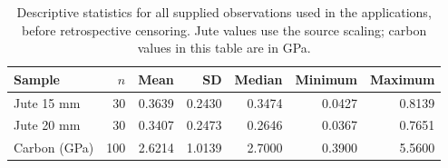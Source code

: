 \begin{table}[htbp]
\centering
\caption{Descriptive statistics for all supplied observations used in the applications, before retrospective censoring. Jute values use the source scaling; carbon values in this table are in GPa.}\label{tab:descriptive}
\small
\begin{tabular}{lrrrrrr}
\toprule
Sample & $n$ & Mean & SD & Median & Minimum & Maximum \\
\midrule
Jute 15 mm & 30 & 0.3639 & 0.2430 & 0.3474 & 0.0427 & 0.8139 \\
Jute 20 mm & 30 & 0.3407 & 0.2473 & 0.2646 & 0.0367 & 0.7651 \\
Carbon (GPa) & 100 & 2.6214 & 1.0139 & 2.7000 & 0.3900 & 5.5600 \\
\bottomrule
\end{tabular}
\end{table}
